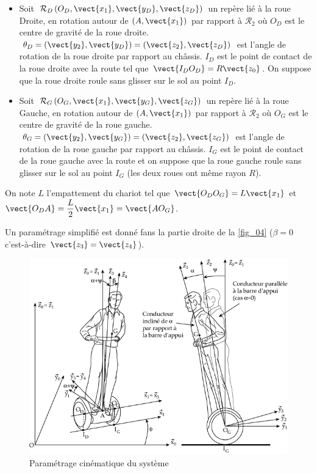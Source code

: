 \documentclass[10pt,fleqn]{article} %
\begin{document}
\begin{itemize}
\item Soit $\mathcal{R}_D\left(O_D,\vect{x_1},\vect{y_D},\vect{z_D} \right)$ un repère lié à la roue Droite, en rotation autour de $\left(A,\vect{x_1}\right)$  par rapport à $\mathcal{R}_2$ où $O_D$ est le centre de gravité de la roue droite.  
$\theta_D=\left(\vect{y_2},\vect{y_D}\right)=\left(\vect{z_2},\vect{z_D}\right)$ est l’angle de rotation de la roue droite par rapport au châssis. $I_D$ est le point de contact de la roue droite avec la route tel que  $\vect{I_D O_D}=R\vect{z_0}$. On suppose que la roue droite roule sans glisser sur le sol au point  $I_D$.
\item Soit $\mathcal{R}_G\left(O_G,\vect{x_1},\vect{y_G},\vect{z_G} \right)$ un repère lié à la roue Gauche, en rotation autour de $\left(A,\vect{x_1}\right)$  par rapport à $\mathcal{R}_2$ où $O_G$ est le centre de gravité de la roue gauche.  
$\theta_G=\left(\vect{y_2},\vect{y_G}\right)=\left(\vect{z_2},\vect{z_G}\right)$ est l’angle de rotation de la roue gauche par rapport au châssis. $I_G$ est le point de contact de la roue gauche avec la route et on suppose que la roue gauche roule sans glisser sur le sol au point $I_G$ (les deux roues ont même rayon $R$).
\end{itemize}

On note $L$ l’empattement du chariot tel que $\vect{O_DO_G}=L\vect{x_1}$ et $\vect{O_D A}=\dfrac{L}{2}\vect{x_1}=\vect{AO_G}$.


Un paramétrage simplifié est donné fans la partie droite de la \autoref{fig_04} ($\beta=0$ c'est-à-dire $\vect{z_3}=\vect{z_4}$).
\begin{figure}[H]
\centering
\includegraphics[width=0.9\linewidth]{fig_04}
\caption{Paramétrage cinématique du système \label{fig_04}}
\end{figure}
\fi
\end{document}
